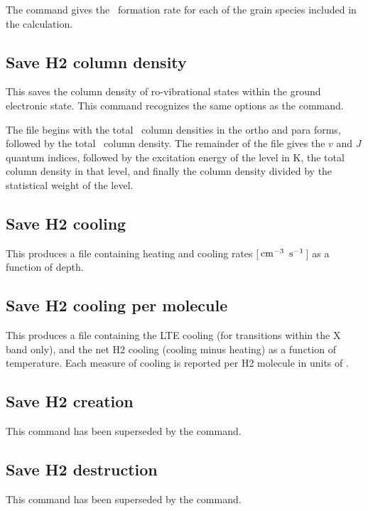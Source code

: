 The  command gives
the \htwo\ formation rate for each of the grain species included in the calculation.

\subsection{Save H2 column density}

This saves the column density of ro-vibrational states within the ground
electronic state.  This command recognizes the same options as the  command.

The file begins with the total \htwo\ column densities
in the ortho and para forms, followed by the total \htwo\ column density.  The remainder of the file
gives the $v$ and $J$ quantum indices, followed by the excitation energy of
the level in K, the total column density in that level, and finally the
column density divided by the statistical weight of the level.

\subsection{Save H2 cooling}

This produces a file containing heating and cooling rates
[${\rm\thinspace cm^{-3}}\ \mbox{${\rm\thinspace s}^{-1}\,$}$] as a function of depth.

\subsection{Save H2 cooling per molecule}

This produces a file containing the LTE cooling (for transitions within the X band only),
and the net H2 cooling (cooling minus heating) as a function of temperature.
Each measure of cooling is reported per H2 molecule in units of \ergps.

\subsection{Save H2 creation}

This command has been superseded by the  command.

\subsection{Save H2 destruction}

This command has been superseded by the  command.

